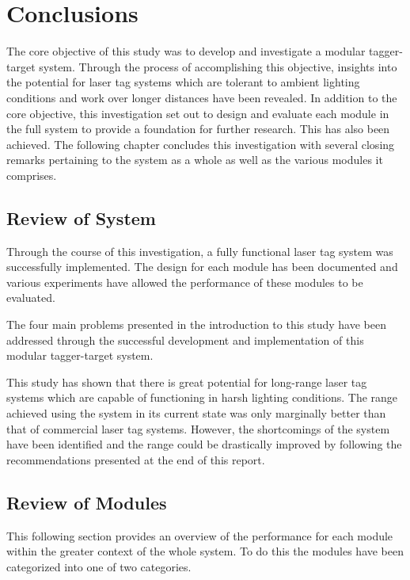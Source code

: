 \chapter{Conclusions}
\label{ch_conclusions}



The core objective of this study was to develop and investigate a modular tagger-target system. Through the process of accomplishing this objective, insights into the potential for laser tag systems which are tolerant to ambient lighting conditions and work over longer distances have been revealed.
In addition to the core objective, this investigation set out to design and evaluate each module in the full system to provide a foundation for further research. This has also been achieved. The following chapter concludes this investigation with several closing remarks pertaining to the system as a whole as well as the various modules it comprises.

\section{Review of System}

Through the course of this investigation, a fully functional laser tag system was successfully implemented. The design for each module has been documented and various experiments have allowed the performance of these modules to be evaluated.

The four main problems presented in the introduction to this study have been addressed through the successful development and implementation of this modular tagger-target system. 

This study has shown that there is great potential for long-range laser tag systems which are capable of functioning in harsh lighting conditions. The range achieved using the system in its current state was only marginally better than that of commercial laser tag systems. However, the shortcomings of the system have been identified and the range could be drastically improved by following the recommendations presented at the end of this report.

\section{Review of Modules}
This following section provides an overview of the performance for each module within the greater context of the whole system. To do this the modules have been categorized into one of two categories.

